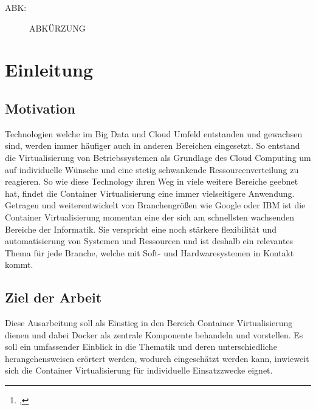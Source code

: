\documentclass[12pt,toc=bib,toc=listof]{scrreprt}
\title{\ebttopic}
\author{\ebtstudentname\footnote{\ebtstudentid, \ebtstudentmail}}
\begin{document}
\maketitle
\tableofcontents

\label{sec:abkuerzungsverzeichnis}

\begin{description}
  \item[ABK:] ABKÜRZUNG 
\end{description}


\listoffigures
\listoftables

\onehalfspacing
\newpage
{}

\chapter{Einleitung} %
\label{sec:einleitung}

\section{Motivation} %
\label{sec:motivation}

Technologien welche im Big Data und Cloud Umfeld entstanden und gewachsen sind, werden immer häufiger auch in anderen Bereichen eingesetzt. So entstand die Virtualisierung von Betriebssystemen als Grundlage des Cloud Computing um auf individuelle Wünsche und eine stetig schwankende Ressourcenverteilung zu reagieren. So wie diese Technology ihren Weg in viele weitere Bereiche geebnet hat, findet die Container Virtualisierung eine immer vielseitigere Anwendung.
Getragen und weiterentwickelt von Branchengrößen wie Google oder IBM ist die Container Virtualisierung momentan eine der sich am schnellsten wachsenden Bereiche der Informatik.
Sie verspricht eine noch stärkere flexibilität und automatisierung von Systemen und Ressourcen und ist deshalb ein relevantes Thema für jede Branche, welche mit Soft- und Hardwaresystemen in Kontakt kommt.



\section{Ziel der Arbeit} %
\label{sec:ziel_der_arbeit}
Diese Ausarbeitung soll als Einstieg in den Bereich Container Virtualisierung dienen und dabei Docker als zentrale Komponente behandeln und vorstellen.
Es soll ein umfassender Einblick in die Thematik und deren unterschiedliche herangehensweisen erörtert werden, wodurch eingeschätzt werden kann, inwieweit sich die Container Virtualisierung für individuelle Einsatzzwecke eignet.
\end{document}
